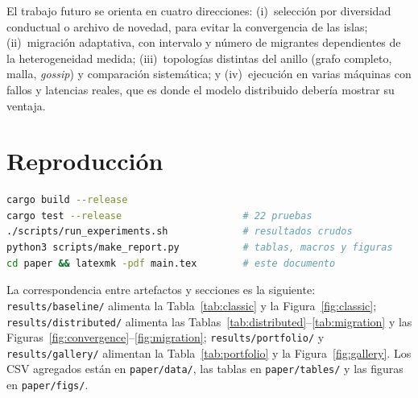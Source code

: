 \documentclass[11pt,a4paper]{article}
\begin{document}
El trabajo futuro se orienta en cuatro direcciones: (i)~selecci\'on por
diversidad conductual o archivo de novedad, para evitar la convergencia de las
islas; (ii)~migraci\'on adaptativa, con intervalo y n\'umero de migrantes
dependientes de la heterogeneidad medida; (iii)~topolog\'ias distintas del anillo
(grafo completo, malla, \emph{gossip}) y comparaci\'on sistem\'atica; y
(iv)~ejecuci\'on en varias m\'aquinas con fallos y latencias reales, que es donde
el modelo distribuido deber\'ia mostrar su ventaja.

\appendix
\section{Reproducci\'on}

\begin{lstlisting}[language=bash,caption={Secuencia completa de
reproducci\'on.},label={lst:repro},numbers=none]
cargo build --release
cargo test --release                     # 22 pruebas
./scripts/run_experiments.sh             # resultados crudos
python3 scripts/make_report.py           # tablas, macros y figuras
cd paper && latexmk -pdf main.tex        # este documento
\end{lstlisting}

La correspondencia entre artefactos y secciones es la siguiente:
\texttt{results/baseline/} alimenta la Tabla~\ref{tab:classic} y la
Figura~\ref{fig:classic}; \texttt{results/distributed/} alimenta las
Tablas~\ref{tab:distributed}--\ref{tab:migration} y las
Figuras~\ref{fig:convergence}--\ref{fig:migration};
\texttt{results/portfolio/} y \texttt{results/gallery/} alimentan la
Tabla~\ref{tab:portfolio} y la Figura~\ref{fig:gallery}.  Los CSV agregados
est\'an en \texttt{paper/data/}, las tablas en \texttt{paper/tables/} y las
figuras en \texttt{paper/figs/}.

{\small


}
\end{document}
